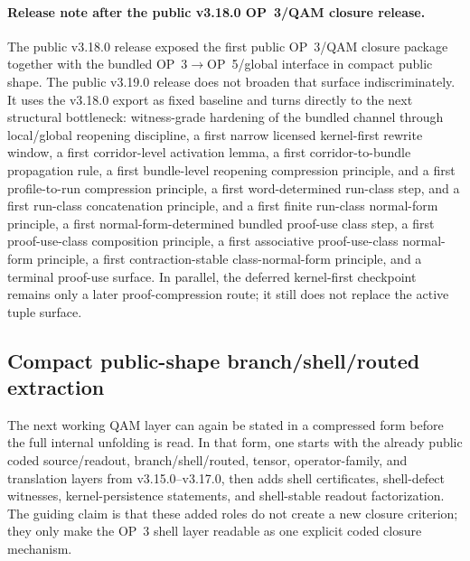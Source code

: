 \paragraph{Release note after the public v3.18.0 OP~3/QAM closure release.}
The public v3.18.0 release exposed the first public OP~3/QAM closure package together with the bundled OP~3$\to$OP~5/global interface in compact public shape. The public v3.19.0 release does not broaden that surface indiscriminately. It uses the v3.18.0 export as fixed baseline and turns directly to the next structural bottleneck: witness-grade hardening of the bundled channel through local/global reopening discipline, a first narrow licensed kernel-first rewrite window, a first corridor-level activation lemma, a first corridor-to-bundle propagation rule, a first bundle-level reopening compression principle, and a first profile-to-run compression principle, a first word-determined run-class step, and a first run-class concatenation principle, and a first finite run-class normal-form principle, a first normal-form-determined bundled proof-use class step, a first proof-use-class composition principle, a first associative proof-use-class normal-form principle, a first contraction-stable class-normal-form principle, and a terminal proof-use surface. In parallel, the deferred kernel-first checkpoint remains only a later proof-compression route; it still does not replace the active tuple surface.

\subsection*{Compact public-shape branch/shell/routed extraction}
The next working QAM layer can again be stated in a compressed form before the full internal unfolding is read. In that form, one starts with the already public coded source/readout, branch/shell/routed, tensor, operator-family, and translation layers from v3.15.0--v3.17.0, then adds shell certificates, shell-defect witnesses, kernel-persistence statements, and shell-stable readout factorization. The guiding claim is that these added roles do not create a new closure criterion; they only make the OP~3 shell layer readable as one explicit coded closure mechanism.

